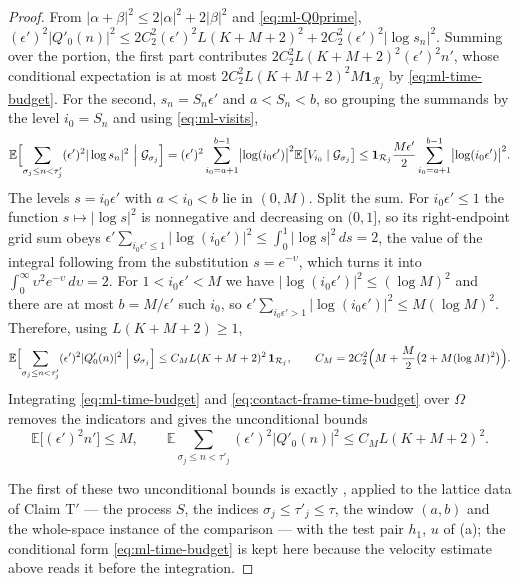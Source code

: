 \begin{proof}
From $|\alpha+\beta|^2\le2|\alpha|^2+2|\beta|^2$ and
\eqref{eq:ml-Q0prime},
$(\epsilon')^2|Q'_0(n)|^2\le2C_2^2(\epsilon')^2L(K+M+2)^2
  +2C_2^2(\epsilon')^2|\log s_n|^2$. Summing over the portion, the first part
contributes $2C_2^2L(K+M+2)^2(\epsilon')^2n'$, whose conditional expectation is
at most $2C_2^2L(K+M+2)^2M\mathbf1_{\mathcal R_j}$ by
\eqref{eq:ml-time-budget}. For the second, $s_n=S_n\epsilon'$ and
$a<S_n<b$, so grouping the summands by the level $i_0=S_n$ and using
\eqref{eq:ml-visits},
\[
  \mathbb E\Bigl[\sum_{\sigma_j\le n<\tau'_j}
     (\epsilon')^2|\log s_n|^2\ \Big|\ \mathcal G_{\sigma_j}\Bigr]
   =(\epsilon')^2\sum_{i_0=a+1}^{b-1}\bigl|\log(i_0\epsilon')\bigr|^2
       \mathbb E\bigl[V_{i_0}\mid\mathcal G_{\sigma_j}\bigr]
   \le\mathbf1_{\mathcal R_j}\frac{M\epsilon'}{2}
       \sum_{i_0=a+1}^{b-1}\bigl|\log(i_0\epsilon')\bigr|^2 .
\]
The levels $s=i_0\epsilon'$ with $a<i_0<b$ lie in $(0,M)$. Split the sum. For
$i_0\epsilon'\le1$ the function $s\mapsto|\log s|^2$ is nonnegative and
decreasing on $(0,1]$, so its right-endpoint grid sum obeys
$\epsilon'\sum_{i_0\epsilon'\le1}|\log(i_0\epsilon')|^2
 \le\int_0^1|\log s|^2\,ds=2$, the value of the integral following from the
substitution $s=e^{-\upsilon}$, which turns it into
$\int_0^\infty\upsilon^2e^{-\upsilon}\,d\upsilon=2$. For
$1<i_0\epsilon'<M$ we have $|\log(i_0\epsilon')|^2\le(\log M)^2$ and there are
at most $b=M/\epsilon'$ such $i_0$, so
$\epsilon'\sum_{i_0\epsilon'>1}|\log(i_0\epsilon')|^2\le M(\log M)^2$.
Therefore, using $L(K+M+2)\ge1$,
\begin{equation}\label{eq:contact-frame-time-budget}
  \mathbb E\Bigl[\sum_{\sigma_j\le n<\tau'_j}
     (\epsilon')^2|Q'_0(n)|^2\ \Big|\ \mathcal G_{\sigma_j}\Bigr]
   \le C_ML(K+M+2)^2\,\mathbf1_{\mathcal R_j},\qquad
  C_M=2C_2^2\Bigl(M+\frac M2\bigl(2+M(\log M)^2\bigr)\Bigr).
\end{equation}
Integrating \eqref{eq:ml-time-budget} and
\eqref{eq:contact-frame-time-budget} over $\Omega$ removes the indicators and
gives the unconditional bounds
\begin{equation}\label{eq:ml-integrated}
  \mathbb E\bigl[(\epsilon')^2n'\bigr]\le M,\qquad
  \mathbb E\sum_{\sigma_j\le n<\tau'_j}(\epsilon')^2|Q'_0(n)|^2
    \le C_ML(K+M+2)^2 .
\end{equation}

The first of these two unconditional bounds is exactly
, applied to the lattice data of Claim
T$'$ --- the process $S$, the indices $\sigma_j\le\tau'_j\le\tau$, the window
$(a,b)$ and the whole-space instance of the comparison --- with the test pair
$h_1$, $u$ of (a); the conditional form \eqref{eq:ml-time-budget} is kept here
because the velocity estimate above reads it before the integration.


\end{proof}
